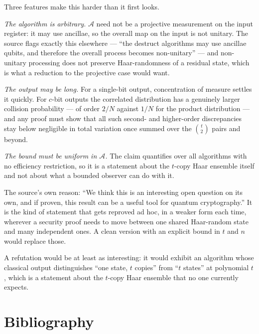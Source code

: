 \documentclass{aicr-conjecture}
\newcommand{\A}{\mathcal{A}}
\begin{document}
\begin{remark}\label{rem:difficulty}
Three features make this harder than it first looks.

\emph{The algorithm is arbitrary.} $\A$ need not be a projective
measurement on the input register: it may use ancillae, so the overall
map on the input is not unitary. The source flags exactly this elsewhere
--- ``the destruct algorithms may use ancillae qubits, and therefore the
overall process becomes non-unitary'' --- and non-unitary processing does
not preserve Haar-randomness of a residual state, which is what a
reduction to the projective case would want.

\emph{The output may be long.} For a single-bit output, concentration of
measure settles it quickly. For $c$-bit outputs the correlated
distribution has a genuinely larger collision probability --- of order
$2/N$ against $1/N$ for the product distribution --- and any proof must
show that all such second- and higher-order discrepancies stay below
negligible in total variation once summed over the
$\binom{t}{2}$ pairs and beyond.

\emph{The bound must be uniform in $\A$.} The claim quantifies over all
algorithms with no efficiency restriction, so it is a statement about the
$t$-copy Haar ensemble itself and not about what a bounded observer can
do with it.
\end{remark}

\begin{remark}\label{rem:why}
The source's own reason: ``We think this is an interesting open question
on its own, and if proven, this result can be a useful tool for quantum
cryptography.'' It is the kind of statement that gets reproved ad hoc,
in a weaker form each time, wherever a security proof needs to move
between one shared Haar-random state and many independent ones. A clean
version with an explicit bound in $t$ and $n$ would replace those.

A refutation would be at least as interesting: it would exhibit an
algorithm whose classical output distinguishes ``one state, $t$ copies''
from ``$t$ states'' at polynomial $t$, which is a statement about the
$t$-copy Haar ensemble that no one currently expects.
\end{remark}

\section{Bibliography}
\end{document}
